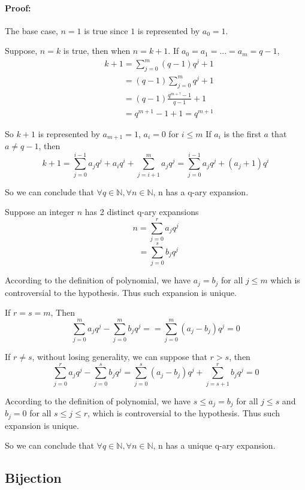 \documentclass[12pt]{article}
\begin{document}
		\paragraph{Proof:}
		
		The base case, $n = 1$ is true since $1$ is represented by $a_0 = 1$.
		
		Suppose, $n = k$ is true, then when $n = k + 1$.
		If $a_0 = a_1 = ... = a_m = q - 1$,
		\begin{align}
			&k + 1 = \sum_{j = 0}^m (q - 1)q^j + 1\nonumber\\
			&\phantom{k + 1} = (q - 1)\sum_{j = 0}^m q^j + 1\nonumber\\
			&\phantom{k + 1} = (q - 1)\frac{q^{m+!} - 1}{q - 1} + 1\nonumber\\
			&\phantom{k + 1} = q^{m+1} - 1 + 1 = q^{m+1}\nonumber 
		\end{align}
		
		So $k + 1$ is represented by $a_{m + 1} = 1$, $a_i = 0$ for $i \leq m$ 
		If $a_i$ is the first $a$ that $a \neq q - 1$, then
		\[k + 1 = \sum_{j = 0}^{i - 1}a_j q^j + a_iq^i +  \sum_{j = i + 1}^{m}a_j q^j = \sum_{j = 0}^{i - 1}a_j q^j + (a_j + 1)q^i \]
		
		So we can conclude that $\forall q \in \mathbb{N}, \forall n \in \mathbb{N}$, n has a q-ary expansion.
		
		Suppose an integer $n$ has 2 distinct q-ary expansions
		\[n = \sum_{j = 0}^r a_jq^j\] 
		\[\phantom{n} = \sum_{j = 0}^s b_jq^j\]
		
		According to the definition of polynomial, we have $a_j = b_j$ for all $j \leq m$ which is controversial to the hypothesis. Thus such expansion is unique.
		
		If $r = s = m$,
		Then \[\sum_{j = 0}^m a_jq^j - \sum_{j = 0}^m b_jq^j =  = \sum_{j = 0}^m (a_j - b_j)q^j = 0\]
		
		If $r \neq s$, without losing generality, we can suppose that $r > s$, then
		\[\sum_{j = 0}^r a_jq^j - \sum_{j = 0}^s b_jq^j = \sum_{j = 0}^s (a_j - b_j)q^j  + \sum_{j = s + 1}^r b_jq^j = 0\]
		
		According to the definition of polynomial, we have $s \leq a_j = b_j$ for all $j \leq s$ and $b_j = 0$ for all $s\leq j \leq r$, which is controversial to the hypothesis. Thus such expansion is unique.
		
		So we can conclude that $\forall q \in \mathbb{N}, \forall n \in \mathbb{N}$, n has a unique q-ary expansion.
		\subsection{Bijection}
		
\end{document}
